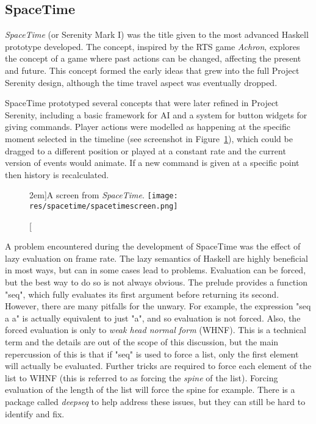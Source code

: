 \subsection{SpaceTime}

\emph{SpaceTime} (or Serenity Mark I) was the title given to the most advanced Haskell prototype developed. The concept, inspired by the RTS game \emph{Achron}, explores the concept of a game where past actions can be changed, affecting the present and future. This concept formed the early ideas that grew into the full Project Serenity design, although the time travel aspect was eventually dropped.

SpaceTime prototyped several concepts that were later refined in Project Serenity, including a basic framework for AI and a system for button widgets for giving commands. Player actions were modelled as happening at the specific moment selected in the timeline (see screenshot in Figure~\ref{fig:spacetimescreen}), which could be dragged to a different position or played at a constant rate and the current version of events would animate. If a new command is given at a specific point then history is recalculated.

\begin{figure}
	\caption[A screen from \emph{SpaceTime}][2em]{A screen from \emph{SpaceTime}.}
	\texttt{[image: res/spacetime/spacetimescreen.png]}
	\label{fig:spacetimescreen}
\end{figure}

A problem encountered during the development of SpaceTime was the effect of lazy evaluation on frame rate. The lazy semantics of Haskell are highly beneficial in most ways, but can in some cases lead to problems. Evaluation can be forced, but the best way to do so is not always obvious. The prelude provides a function "seq", which fully evaluates its first argument before returning its second. However, there are many pitfalls for the unwary. For example, the expression "seq a a" is actually equivalent to just "a", and so evaluation is not forced. Also, the forced evaluation is only to \emph{weak head normal form} (WHNF). This is a technical term and the details are out of the scope of this discussion, but the main repercussion of this is that if "seq" is used to force a list, only the first element will actually be evaluated. Further tricks are required to force each element of the list to WHNF (this is referred to as forcing the \emph{spine} of the list). Forcing evaluation of the length of the list will force the spine for example. There is a package called \emph{deepseq} to help address these issues, but they can still be hard to identify and fix.

